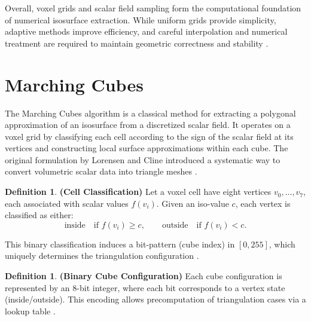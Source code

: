 \documentclass[12pt, a4paper, oneside]{book}
\theoremstyle{plain}
\theoremstyle{definition}
\newtheorem{definition}[theorem]{Definition}
\theoremstyle{remark}
\theoremstyle{definition}
\begin{document}
\vspace{0.5em}

Overall, voxel grids and scalar field sampling form the computational foundation of numerical isosurface extraction. While uniform grids provide simplicity, adaptive methods improve efficiency, and careful interpolation and numerical treatment are required to maintain geometric correctness and stability \cite{lorensen1998marching,bloomenthal1997introduction,frisken2000adaptively,cignoni1998metro,goldberg1991every}.
\section{Marching Cubes}

The Marching Cubes algorithm is a classical method for extracting a polygonal approximation of an isosurface from a discretized scalar field. It operates on a voxel grid by classifying each cell according to the sign of the scalar field at its vertices and constructing local surface approximations within each cube. The original formulation by Lorensen and Cline introduced a systematic way to convert volumetric scalar data into triangle meshes \cite{lorensen1998marching}.

\vspace{0.5em}

\begin{definition}
    \textbf{(Cell Classification)}
Let a voxel cell have eight vertices $v_0, \dots, v_7$, each associated with scalar values $f(v_i)$. Given an iso-value $c$, each vertex is classified as either:
\[
\text{inside} \quad \text{if } f(v_i) \geq c, \qquad \text{outside} \quad \text{if } f(v_i) < c.
\]
\end{definition}

This binary classification induces a bit-pattern (cube index) in $[0,255]$, which uniquely determines the triangulation configuration \cite{lorensen1998marching}.

\vspace{0.5em}

\begin{definition}
    \textbf{(Binary Cube Configuration)}
Each cube configuration is represented by an 8-bit integer, where each bit corresponds to a vertex state (inside/outside). This encoding allows precomputation of triangulation cases via a lookup table \cite{lorensen1998marching}.

\end{definition}

\vspace{0.5em}
\end{document}
